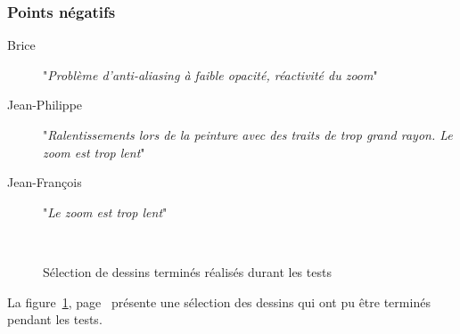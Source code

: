 		\subsubsection{Points négatifs}
			\begin{description}
				\item[Brice] "\emph{Problème d'anti-aliasing à faible opacité, réactivité du zoom}"
				\item[Jean-Philippe] "\emph{Ralentissements lors de la peinture avec des traits de trop grand rayon. Le zoom est trop lent}"
				\item[Jean-François] "\emph{Le zoom est trop lent}"
			\end{description}	
	\begin{figure}[h]
		\centering
		\\
		\caption{Sélection de dessins terminés réalisés durant les tests}
		\label{fig:paintings}
	\end{figure}
	La figure~\ref{fig:paintings}, page~\pageref{fig:paintings} présente une sélection des dessins qui ont pu être terminés pendant les tests.

